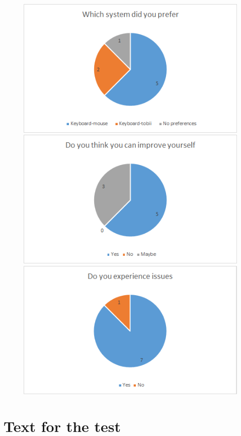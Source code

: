 \documentclass[12pt, a4paper]{article}
\begin{document}
\begin{figure}[H]
\includegraphics[scale =.6]{Preference}
\includegraphics[scale =.6]{Improvement}
\includegraphics[scale =.6]{Issues}
\end{figure}
\newpage
\section{Text for the test}
\label{Test}

 
\end{document}
